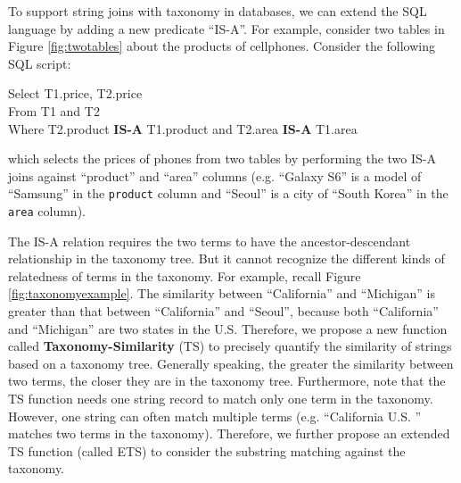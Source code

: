 


To support string joins with taxonomy in databases, we can extend the SQL language by adding a new predicate ``IS-A''. For example,
consider two tables in Figure \ref{fig:twotables} about the products of cellphones.  Consider the following SQL script:

\vspace{2mm}

\noindent \textsf{Select T1.price, T2.price} \\
\noindent \textsf{ From T1 and T2} \\
\noindent   \textsf{Where T2.product \textbf{IS-A} T1.product and T2.area \textbf{IS-A} T1.area}

 \vspace{2mm}


\noindent which selects the prices of phones from two tables by performing the two IS-A joins against ``\textsf{product}'' and ``\textsf{area}'' columns (e.g. ``\textsf{Galaxy S6}'' is a model of ``\textsf{Samsung}'' in the \texttt{product} column and ``\textsf{Seoul}'' is a city of ``\textsf{South Korea}'' in the \texttt{area} column).


The IS-A relation requires the two terms to have the ancestor-descendant relationship in the taxonomy tree. But it cannot recognize the different kinds of relatedness of terms in the taxonomy. For example, recall Figure \ref{fig:taxonomyexample}. The similarity between ``\textsf{California}'' and ``\textsf{Michigan}'' is greater than that between ``\textsf{California}'' and ``\textsf{Seoul}'', because  both ``\textsf{California}'' and ``\textsf{Michigan}'' are two states in the U.S. Therefore, we propose a new function called \textbf{Taxonomy-Similarity} (TS) to precisely quantify the similarity of strings based on a taxonomy tree. Generally speaking,  the greater the similarity between two terms, the closer they are in the taxonomy tree.  Furthermore, note that the TS function needs one string record to  match only one term in the taxonomy. However, one string can often match multiple terms (e.g. ``\textsf{California U.S.} '' matches two terms in the taxonomy). Therefore, we further propose an extended TS function (called ETS) to  consider the substring matching against the taxonomy. 


